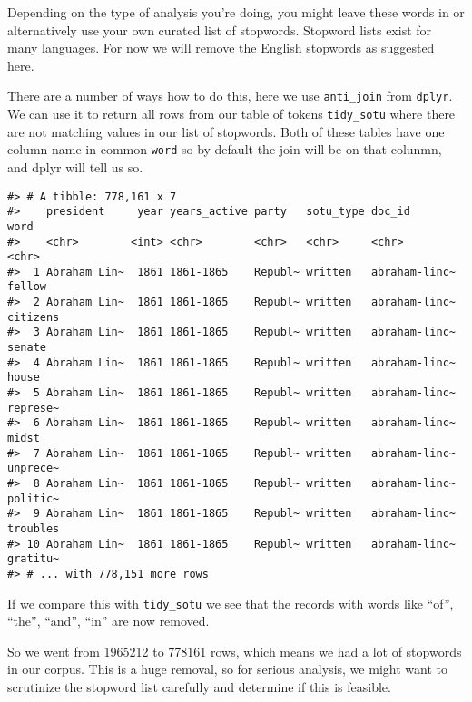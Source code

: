 \documentclass[]{book}
\newenvironment{Shaded}{\begin{snugshade}}{\end{snugshade}}
\newcommand{\KeywordTok}[1]{\textcolor[rgb]{0.13,0.29,0.53}{\textbf{#1}}}
\newcommand{\NormalTok}[1]{#1}
\newcommand{\OperatorTok}[1]{\textcolor[rgb]{0.81,0.36,0.00}{\textbf{#1}}}
\newcommand{\StringTok}[1]{\textcolor[rgb]{0.31,0.60,0.02}{#1}}
\begin{document}
Depending on the type of analysis you're doing, you might leave these words in or alternatively use your own curated list of stopwords. Stopword lists exist for many languages. For now we will remove the English stopwords as suggested here.

There are a number of ways how to do this, here we use \texttt{anti\_join} from \texttt{dplyr}. We can use it to return all rows from our table of tokens \texttt{tidy\_sotu} where there are not matching values in our list of stopwords. Both of these tables have one column name in common \texttt{word} so by default the join will be on that colunmn, and dplyr will tell us so.

\begin{Shaded}
\end{Shaded}

\begin{verbatim}
#> # A tibble: 778,161 x 7
#>    president     year years_active party   sotu_type doc_id        word    
#>    <chr>        <int> <chr>        <chr>   <chr>     <chr>         <chr>   
#>  1 Abraham Lin~  1861 1861-1865    Republ~ written   abraham-linc~ fellow  
#>  2 Abraham Lin~  1861 1861-1865    Republ~ written   abraham-linc~ citizens
#>  3 Abraham Lin~  1861 1861-1865    Republ~ written   abraham-linc~ senate  
#>  4 Abraham Lin~  1861 1861-1865    Republ~ written   abraham-linc~ house   
#>  5 Abraham Lin~  1861 1861-1865    Republ~ written   abraham-linc~ represe~
#>  6 Abraham Lin~  1861 1861-1865    Republ~ written   abraham-linc~ midst   
#>  7 Abraham Lin~  1861 1861-1865    Republ~ written   abraham-linc~ unprece~
#>  8 Abraham Lin~  1861 1861-1865    Republ~ written   abraham-linc~ politic~
#>  9 Abraham Lin~  1861 1861-1865    Republ~ written   abraham-linc~ troubles
#> 10 Abraham Lin~  1861 1861-1865    Republ~ written   abraham-linc~ gratitu~
#> # ... with 778,151 more rows
\end{verbatim}

If we compare this with \texttt{tidy\_sotu} we see that the records with words like ``of'', ``the'', ``and'', ``in'' are now removed.

So we went from 1965212 to 778161 rows, which means we had a lot of stopwords in our corpus. This is a huge removal, so for serious analysis, we might want to scrutinize the stopword list carefully and determine if this is feasible.
\end{document}
